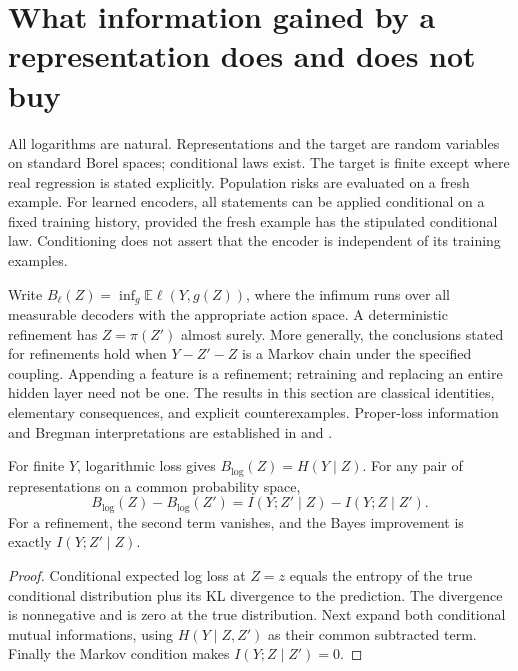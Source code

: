 \section{What information gained by a representation does and does not buy}
\label{sec:p7-information-boundaries}

All logarithms are natural. Representations and the target are random
variables on standard Borel spaces; conditional laws exist. The target is
finite except where real regression is stated explicitly. Population risks
are evaluated on a fresh example. For learned encoders, all statements can
be applied conditional on a fixed training history, provided the fresh
example has the stipulated conditional law. Conditioning does not assert
that the encoder is independent of its training examples.

Write $B_\ell(Z)=\inf_g\mathbb E\ell(Y,g(Z))$, where the infimum
runs over all measurable decoders with the appropriate action space.
A deterministic refinement has $Z=\pi(Z')$ almost surely. More generally,
the conclusions stated for refinements hold when $Y-Z'-Z$ is a Markov
chain under the specified coupling. Appending a feature is a refinement;
retraining and replacing an entire hidden layer need not be one.
The results in this section are classical identities, elementary
consequences, and explicit counterexamples. Proper-loss information and
Bregman interpretations are established in
\cite[Theorems 8 and 10]{p7reid2011} and
\cite[Theorem 1 and Section 2.2]{p7gneiting2007}.

\begin{proposition}
\label{prop:p7-log-forgetting}
For finite $Y$, logarithmic loss gives $B_{\log}(Z)=H(Y\mid Z)$.
For any pair of representations on a common probability space,
\[
 B_{\log}(Z)-B_{\log}(Z')
 =I(Y;Z'\mid Z)-I(Y;Z\mid Z').
\]
For a refinement, the second term vanishes, and the Bayes improvement is
exactly $I(Y;Z'\mid Z)$.
\end{proposition}
\begin{proof}
Conditional expected log loss at $Z=z$ equals the entropy of the true
conditional distribution plus its KL divergence to the prediction.
The divergence is nonnegative and is zero at the true distribution.
Next expand both conditional mutual informations, using
$H(Y\mid Z,Z')$ as their common subtracted term. Finally the Markov
condition makes $I(Y;Z\mid Z')=0$.
\end{proof}

